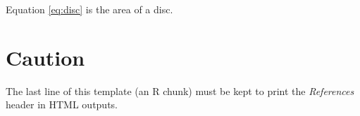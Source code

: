 \documentclass[fleqn,10pt]{article} %
\begin{document}
\normalsize

Equation \eqref{eq:disc} is the area of a disc.

\hypertarget{caution}{%
\section{Caution}\label{caution}}

The last line of this template (an R chunk) must be kept to print the \emph{References} header in HTML outputs.



\makeatletter

\makeatother


\end{document}
